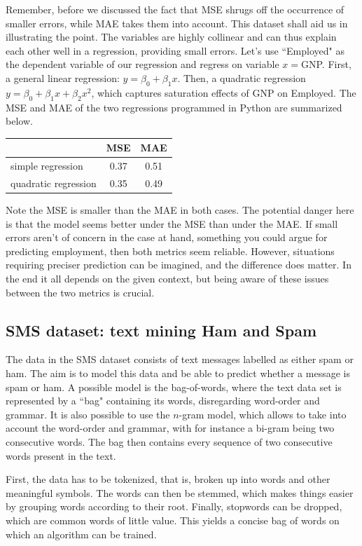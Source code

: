 \documentclass{llncs}
\begin{document}
Remember, before we discussed the fact that MSE shrugs off the occurrence of smaller errors, while MAE takes them into account. This dataset shall aid us in illustrating the point. The variables are highly collinear and can thus explain each other well in a regression, providing small errors. Let's use ``Employed" as the dependent variable of our regression and regress on variable $x=$GNP. First, a general linear regression: $\displaystyle y = \beta_{0} + \beta_{1}x$. Then, a quadratic regression $\displaystyle y = \beta_{0} + \beta_{1}x +\beta_{2}x^{2}$, which captures saturation effects of GNP on Employed. The MSE and MAE of the two regressions programmed in Python are summarized below.
\begin{table}[H]
    \centering
    \begin{tabular}{l | c | c}
        & MSE & MAE\\ \hline
        simple regression & 0.37& 0.51 \\
        quadratic regression & 0.35 & 0.49
    \end{tabular}
    \label{table:MSE_vs_MAE}
\end{table}
\noindent Note the MSE is smaller than the MAE in both cases. The potential danger here is that the model seems better under the MSE than under the MAE. If small errors aren't of concern in the case at hand, something you could argue for predicting employment, then both metrics seem reliable. However, situations requiring preciser prediction can be imagined, and the difference does matter. In the end it all depends on the given context, but being aware of these issues between the two metrics is crucial.

\subsection{SMS dataset: text mining Ham and Spam}
The data in the SMS dataset consists of text messages labelled as either spam or ham. The aim is to model this data and be able to predict whether a message is spam or ham. A possible model is the bag-of-words, where the text data set is represented by a ``bag" containing its words, disregarding word-order and grammar. It is also possible to use the $n$-gram model, which allows to take into account the word-order and grammar, with for instance a bi-gram being two consecutive words. The bag then contains every sequence of two consecutive words present in the text. 

First, the data has to be tokenized, that is, broken up into words and other meaningful symbols. The words can then be stemmed, which makes things easier by grouping words according to their root. Finally, stopwords can be dropped, which are common words of little value. This yields a concise bag of words on which an algorithm can be trained.
\end{document}

